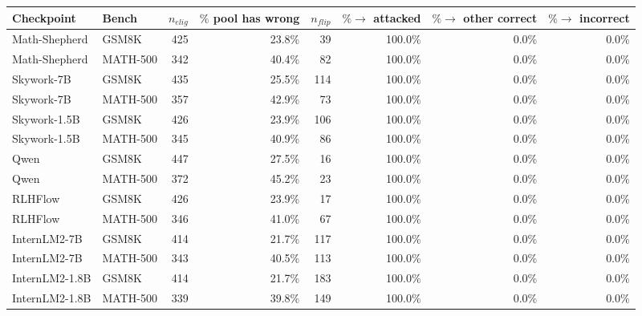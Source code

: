\begin{tabular}{llrrrrrr}
\toprule
Checkpoint & Bench & $n_{elig}$ & $\%$ pool has wrong & $n_{flip}$ & $\%\to$ attacked & $\%\to$ other correct & $\%\to$ incorrect \\
\midrule
Math-Shepherd & GSM8K & 425 & 23.8\% & 39 & 100.0\% & 0.0\% & 0.0\% \\
Math-Shepherd & MATH-500 & 342 & 40.4\% & 82 & 100.0\% & 0.0\% & 0.0\% \\
Skywork-7B & GSM8K & 435 & 25.5\% & 114 & 100.0\% & 0.0\% & 0.0\% \\
Skywork-7B & MATH-500 & 357 & 42.9\% & 73 & 100.0\% & 0.0\% & 0.0\% \\
Skywork-1.5B & GSM8K & 426 & 23.9\% & 106 & 100.0\% & 0.0\% & 0.0\% \\
Skywork-1.5B & MATH-500 & 345 & 40.9\% & 86 & 100.0\% & 0.0\% & 0.0\% \\
Qwen & GSM8K & 447 & 27.5\% & 16 & 100.0\% & 0.0\% & 0.0\% \\
Qwen & MATH-500 & 372 & 45.2\% & 23 & 100.0\% & 0.0\% & 0.0\% \\
RLHFlow & GSM8K & 426 & 23.9\% & 17 & 100.0\% & 0.0\% & 0.0\% \\
RLHFlow & MATH-500 & 346 & 41.0\% & 67 & 100.0\% & 0.0\% & 0.0\% \\
InternLM2-7B & GSM8K & 414 & 21.7\% & 117 & 100.0\% & 0.0\% & 0.0\% \\
InternLM2-7B & MATH-500 & 343 & 40.5\% & 113 & 100.0\% & 0.0\% & 0.0\% \\
InternLM2-1.8B & GSM8K & 414 & 21.7\% & 183 & 100.0\% & 0.0\% & 0.0\% \\
InternLM2-1.8B & MATH-500 & 339 & 39.8\% & 149 & 100.0\% & 0.0\% & 0.0\% \\
\bottomrule
\end{tabular}
